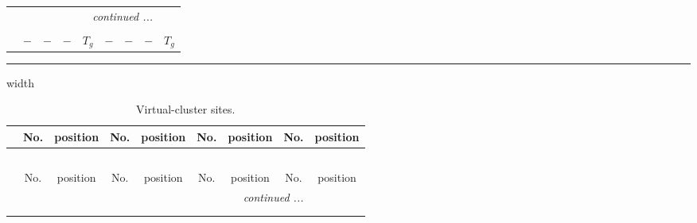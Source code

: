 \documentclass[fleqn,10pt,landscape]{article}
\begin{document}
\begin{itemize}
\begin{center}
\begin{longtable}{ccccccccc}
 \hline \hline
\multicolumn{8}{r}{\footnotesize\it continued ...} \\ \endfoot

 \hline \hline
\multicolumn{8}{r}{} \\ \endlastfoot

$  $ & $ - $ & $ - $ & $ - $ & $ T_{g} $ & $ - $ & $ - $ & $ - $ & $ T_{g} $ \\
\end{longtable}
\end{center}

 \hfil \hrule height 1mm width \textwidth \hfil

{
\scriptsize
\begin{center}
\renewcommand{\arraystretch}{1.7}
\begin{longtable}{ccccccccc}
\caption{Virtual-cluster sites.}
 \\
 \hline \hline
 & No. & position & No. & position & No. & position & No. & position \\ \hline \endfirsthead

\multicolumn{8}{l}{\tablename\ \thetable{}} \\
 \hline \hline
 & No. & position & No. & position & No. & position & No. & position \\ \hline \endhead

 \hline \hline
\multicolumn{8}{r}{\footnotesize\it continued ...} \\ \endfoot

 \hline \hline
\multicolumn{8}{r}{} \\ \endlastfoot


\end{longtable}
\end{center}}
\end{itemize}
\end{document}
